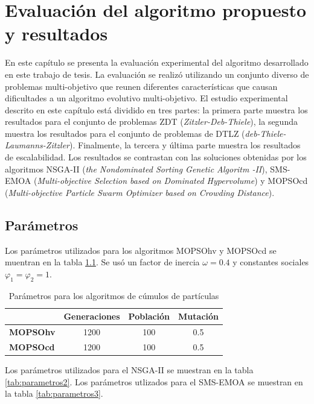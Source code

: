 
\chapter{Evaluaci\'on del algoritmo propuesto y resultados}

En este cap\'itulo se presenta la evaluaci\'on experimental del algoritmo desarrollado en este trabajo de tesis. 
La evaluaci\'on se realiz\'o utilizando un conjunto diverso de problemas multi-objetivo que reunen diferentes caracter\'isticas que causan 
dificultades a un algoritmo evolutivo multi-objetivo. El estudio experimental descrito en este cap\'itulo est\'a dividido 
en tres partes: la primera parte muestra los resultados para el conjunto de problemas ZDT (\textit{Zitzler-Deb-Thiele}), 
la segunda muestra los resultados para el conjunto de problemas de DTLZ (\textit{deb-Thiele-Laumanns-Zitzler}). 
Finalmente, la tercera y \'ultima parte muestra los resultados de escalabilidad. Los resultados se contrastan 
con las soluciones obtenidas por los algoritmos NSGA-II (\textit{the Nondominated Sorting Genetic Algoritm -II}), SMS-EMOA 
(\textit{Multi-objective Selection based on Dominated Hypervolume}) y MOPSOcd (\textit{Multi-objective Particle Swarm Optimizer based on 
Crowding Distance}).
  
  \section*{Par\'ametros}
  
  Los par\'ametros utilizados para los algoritmos MOPSOhv y MOPSOcd se muentran en la tabla \ref{tab:parametros1}. Se us\'o un factor de 
  inercia $\omega = 0.4$ y constantes sociales $\varphi_{1}=\varphi_{2}=1$.
 
 \begin{table}[H]
  \begin{center}
    \begin{tabular}{|l||c|c|c|}
	\hline
	& \textbf{Generaciones}  & \textbf{Poblaci\'on} & \textbf{Mutaci\'on} \\
	\hline
	\hline
	\textbf{MOPSOhv} & 1200 & 100 &0.5\\ 
	\hline
	\textbf{MOPSOcd} & 1200 & 100 &0.5\\
	\hline
	\end{tabular}
	\caption{Par\'ametros para los algoritmos de c\'umulos de part\'iculas}
  \label{tab:parametros1}
  \end{center}
\end{table}

Los par\'ametros utilizados para el NSGA-II se muestran en la tabla \ref{tab:parametros2}. Los par\'ametros
utlizados para el SMS-EMOA se muestran en la tabla \ref{tab:parametros3}.


